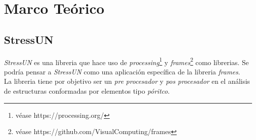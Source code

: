 \usetikzlibrary{arrows, shapes, positioning, shadows, trees}

\chapter{Marco Teórico}


\section{StressUN}
\textit{StressUN} es una libreria que hace uso de \textit{processing}\footnote{véase https://processing.org/} y \textit{frames}\footnote{véase https://github.com/VisualComputing/frames} como librerias. Se podría pensar a \textit{StressUN} como una aplicación específica de la libreria \textit{frames}. \\

La libreria tiene por objetivo ser un \textit{pre procesador} y \textit{pos procesador} en el análisis de estructuras conformadas por elementos tipo \textit{póritco}.\\

